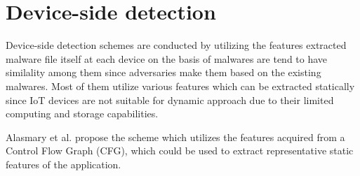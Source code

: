 \section{Device-side detection} 
Device-side detection schemes are conducted by utilizing the features extracted malware file itself at each device on the basis of malwares are tend to have similality among them since adversaries make them based on the existing malwares.
Most of them utilize various features which can be extracted statically since IoT devices are not suitable for dynamic approach due to their limited computing and storage capabilities.

Alasmary et al. \cite{cfg} propose the scheme which utilizes the features acquired from a Control Flow Graph (CFG), which could be used to extract representative static features of the application.

\newpage

